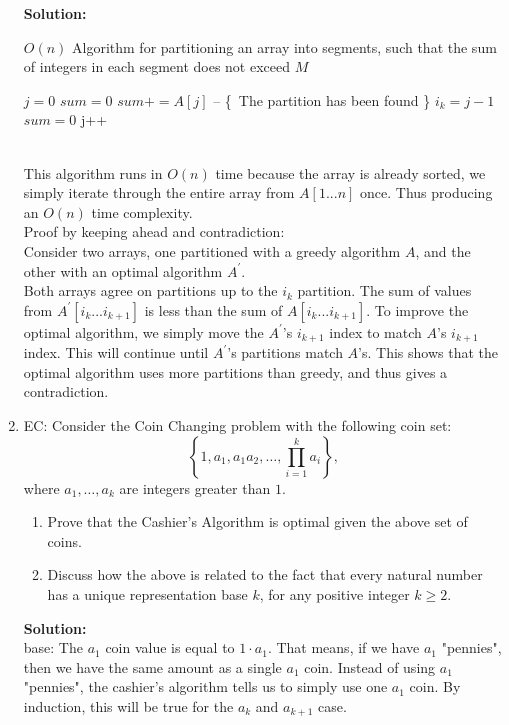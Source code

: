 \documentclass[11pt]{article}
\begin{document}
\begin{enumerate}
\textbf{Solution:}\\
\begin{algorithm}
\caption{$O(n)$ Algorithm for partitioning an array into segments, such that the sum of integers in each segment does not exceed $M$}
	\begin{algorithmic}
    	\State $j = 0$
        \State $sum = 0$
        	\State $sum += A[j]$
			 -- \{\ The partition has been found \} 
            	\State $i_k = j - 1$
                \State $sum = 0$
            \EndIf
            \State j++
        \EndWhile
    \EndProcedure
	\end{algorithmic}
    \label{alg-partition}
\end{algorithm}\\

This algorithm runs in $O(n)$ time because the array is already sorted, we simply iterate through the entire array from $A[1...n]$ once. Thus producing an $O(n)$ time complexity.\\

Proof by keeping ahead and contradiction:\\

Consider two arrays, one partitioned with a greedy algorithm $A$, and the other with an optimal algorithm $A^\prime$.\\
Both arrays agree on partitions up to the $i_k$ partition. The sum of values from $A^{\prime}[i_k...i_{k+1}]$ is less than the sum of $A[i_k...i_{k+1}]$. To improve the optimal algorithm, we simply move the $A^{\prime}$'s $i_{k+1}$ index to match $A$'s $i_{k+1}$ index. This will continue until $A^{\prime}$'s partitions match $A$'s. This shows that the optimal algorithm uses more partitions than greedy, and thus gives a contradiction.\\



\vspace*{.2cm}
\item EC: 
Consider the Coin Changing problem with the following coin set:
\begin{displaymath}
\left\{1, a_1, a_1a_2, \dots, \prod_{i=1}^k a_i\right\},
\end{displaymath}
where $a_1,\dots,a_k$ are integers greater than $1$.
\begin{enumerate}
\item
Prove that the Cashier's Algorithm is optimal given the above set of
coins.
\item
Discuss how the above is related to the fact
that every natural number has a
unique representation base $k$, for any positive integer
$k\ge 2$.
\end{enumerate}
\textbf{Solution:}\\
base:
The $a_1$ coin value is equal to $1 \cdot a_1$. That means, if we have $a_1$ "pennies", then we have the same amount as a single $a_1$ coin. Instead of using $a_1$ "pennies", the cashier's algorithm tells us to simply use one $a_1$ coin. By induction, this will be true for the $a_k$ and $a_{k+1}$ case.
\end{enumerate}
\end{document}
